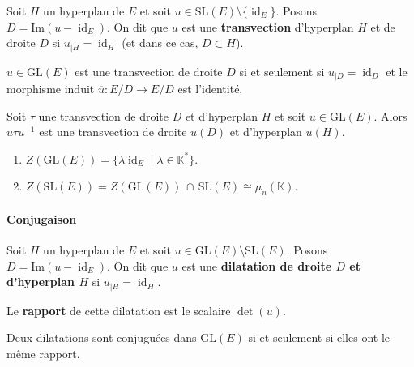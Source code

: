 
	\begin{definition}
		Soit $H$ un hyperplan de $E$ et soit $u \in \mathrm{SL}(E) \setminus \{ \operatorname{id}_E \}$. Posons $D = \mathrm{Im}(u - \operatorname{id}_E)$. On dit que $u$ est une \textbf{transvection} d'hyperplan $H$ et de droite $D$ si $u_{|H} = \operatorname{id}_H$ (et dans ce cas, $D \subset H$).
	\end{definition}

	\begin{proposition}
		$u \in \mathrm{GL}(E)$ est une transvection de droite $D$ si et seulement si $u_{|D} = \operatorname{id}_D$ et le morphisme induit $\overline{u} : E/D \rightarrow E/D$ est l'identité.
	\end{proposition}

	\begin{proposition}
		Soit $\tau$ une transvection de droite $D$ et d'hyperplan $H$ et soit $u \in \mathrm{GL}(E)$. Alors $u \tau u^{-1}$ est une transvection de droite $u(D)$ et d'hyperplan $u(H)$.
	\end{proposition}

	\begin{corollary}
		\begin{enumerate}
			\item $Z(\mathrm{GL}(E)) = \{ \lambda \operatorname{id}_E \mid \lambda \in \mathbb{K}^* \}$.
			\item $Z(\mathrm{SL}(E)) = Z(\mathrm{GL}(E)) \, \cap \, \mathrm{SL}(E) \cong \mu_n(\mathbb{K})$.
		\end{enumerate}
	\end{corollary}

	\paragraph{Conjugaison}

	\begin{definition}
		Soit $H$ un hyperplan de $E$ et soit $u \in \mathrm{GL}(E) \setminus \mathrm{SL}(E)$. Posons $D = \mathrm{Im}(u - \operatorname{id}_E)$. On dit que $u$ est une \textbf{dilatation de droite $D$ et d'hyperplan $H$} si $u_{|H} = \operatorname{id}_H$.

		\medskip
		Le \textbf{rapport} de cette dilatation est le scalaire $\det(u)$.
	\end{definition}

	\begin{proposition}
		Deux dilatations sont conjuguées dans $\mathrm{GL}(E)$ si et seulement si elles ont le même rapport.
	\end{proposition}

